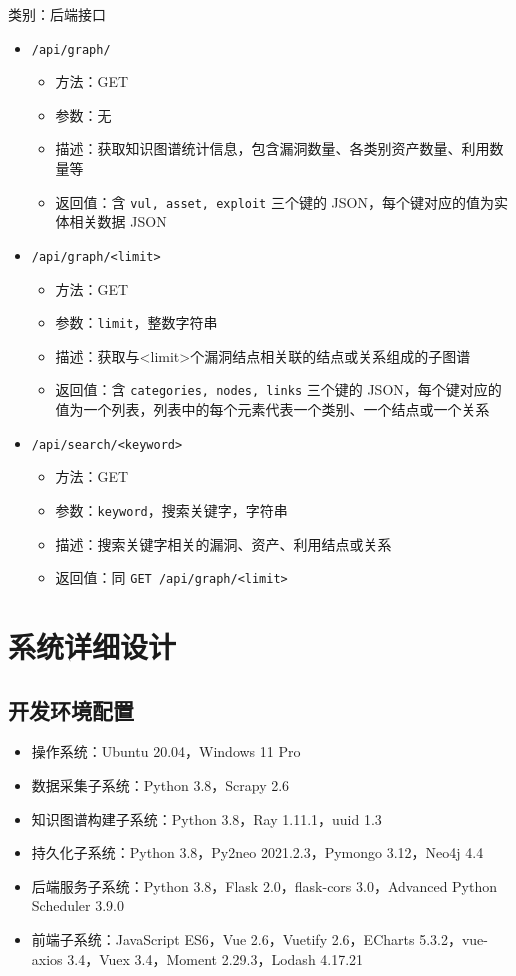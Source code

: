 \documentclass[a4paper,AutoFakeBold,oneside,12pt]{book}
\begin{document}
类别：后端接口
\begin{itemize}
	\item \lstinline|/api/graph/|
	      \begin{itemize}
		      \item 方法：GET
		      \item 参数：无
		      \item 描述：获取知识图谱统计信息，包含漏洞数量、各类别资产数量、利用数量等
		      \item 返回值：含 \lstinline|vul, asset, exploit| 三个键的 JSON，每个键对应的值为实体相关数据 JSON
	      \end{itemize}
	\item \lstinline|/api/graph/<limit>|
	      \begin{itemize}
		      \item 方法：GET
		      \item 参数：\lstinline|limit|，整数字符串
		      \item 描述：获取与<limit>个漏洞结点相关联的结点或关系组成的子图谱
		      \item 返回值：含 \lstinline|categories, nodes, links| 三个键的 JSON，每个键对应的值为一个列表，列表中的每个元素代表一个类别、一个结点或一个关系
	      \end{itemize}
	\item \lstinline|/api/search/<keyword>|
	      \begin{itemize}
		      \item 方法：GET
		      \item 参数：\lstinline|keyword|，搜索关键字，字符串
		      \item 描述：搜索关键字相关的漏洞、资产、利用结点或关系
		      \item 返回值：同 \lstinline|GET /api/graph/<limit>|
	      \end{itemize}
\end{itemize}

\section{系统详细设计}

\subsection{开发环境配置}

\begin{itemize}
	\item 操作系统：Ubuntu 20.04，Windows 11 Pro
	\item 数据采集子系统：Python 3.8，Scrapy 2.6
	\item 知识图谱构建子系统：Python 3.8，Ray 1.11.1，uuid 1.3
	\item 持久化子系统：Python 3.8，Py2neo 2021.2.3，Pymongo 3.12，Neo4j 4.4
	\item 后端服务子系统：Python 3.8，Flask 2.0，flask-cors 3.0，Advanced Python Scheduler 3.9.0
	\item 前端子系统：JavaScript ES6，Vue 2.6，Vuetify 2.6，ECharts 5.3.2，vue-axios 3.4，Vuex 3.4，Moment 2.29.3，Lodash 4.17.21
\end{itemize}
\end{document}
